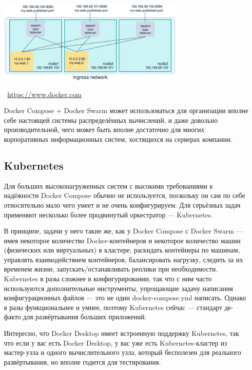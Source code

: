 \documentclass[a5paper]{article}
\newcommand{\attribution}[1] {
    \vspace{-5mm}\begin{flushright}\begin{scriptsize}\textcolor{gray}{\textcopyright\, #1}\end{scriptsize}\end{flushright}
}
\begin{document}
\begin{center}
    \includegraphics[width=0.7\textwidth]{swarmLoadBalancing.png}
    \attribution{\url{https://www.docker.com}}
\end{center}

Docker Compose + Docker Swarm может использоваться для организации вполне себе настоящей системы распределённых вычислений, и даже довольно производительной, чего может быть вполне достаточно для многих корпоративных информационных систем, хостящихся на серверах компании.

\subsection{Kubernetes}


Для больших высоконагруженных систем с высокими требованиями к надёжности Docker Compose обычно не используется, поскольку он сам по себе относительно мало чего умеет и не очень конфигурируем. Для серьёзных задач применяют несколько более продвинутый оркестратор --- Kubernetes. 

В принципе, задачи у него такие же, как у Docker Compose с Docker Swarm --- имея некоторое количество Docker-контейнеров и некоторое количество машин (физических или виртуальных) в кластере, раскидать контейнеры по машинам, управлять взаимодействием контейнеров, балансировать нагрузку, следить за их временем жизни, запускать/останавливать реплики при необходимости. Kubernetes в разы сложнее в конфигурировании, так что с ним часто используются дополнительные инструменты, упрощающие задачу написания конфигурационных файлов --- это не один docker-compose.yml написать. Однако в разы функциональнее и умнее, поэтому Kubernetes сейчас --- стандарт де-факто для развёртывания больших приложений. 

Интересно, что Docker Desktop имеет встроенную поддержку Kubernetes, так что если у вас есть Docker Desktop, у вас уже есть Kubernetes-кластер из мастер-узла и одного вычислительного узла, который бесполезен для реального развёртывания, но вполне годится для тестирования.
\end{document}
